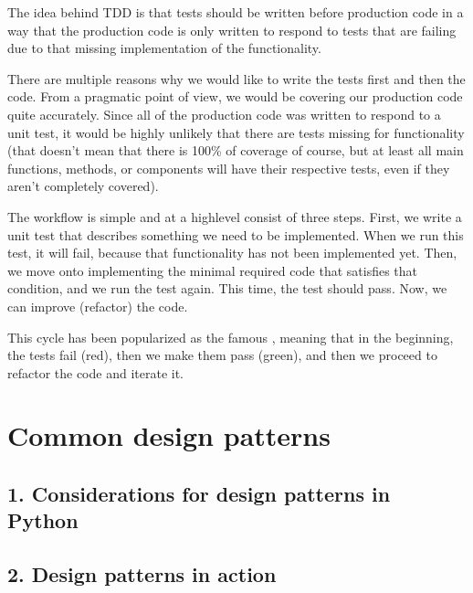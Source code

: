 \documentclass[a4paper,10pt,english]{sphinxmanual}
\begin{document}
The idea behind TDD is that tests should be written before production code in a way that
the production code is only written to respond to tests that are failing due to that missing
implementation of the functionality.

There are multiple reasons why we would like to write the tests first and then the code.
From a pragmatic point of view, we would be covering our production code quite
accurately. Since all of the production code was written to respond to a unit test, it would
be highly unlikely that there are tests missing for functionality (that doesn’t mean that there
is 100\% of coverage of course, but at least all main functions, methods, or components will
have their respective tests, even if they aren’t completely covered).

The workflow is simple and at a high\sphinxhyphen{}level consist of three steps. First, we write a unit test
that describes something we need to be implemented. When we run this test, it will fail,
because that functionality has not been implemented yet. Then, we move onto
implementing the minimal required code that satisfies that condition, and we run the test
again. This time, the test should pass. Now, we can improve (refactor) the code.

This cycle has been popularized as the famous , meaning that in the
beginning, the tests fail (red), then we make them pass (green), and then we proceed to
refactor the code and iterate it.


\chapter{Common design patterns}
\label{\detokenize{chapters/9_design_patterns/index:common-design-patterns}}\label{\detokenize{chapters/9_design_patterns/index::doc}}

\section{1. Considerations for design patterns in Python}
\label{\detokenize{chapters/9_design_patterns/index:considerations-for-design-patterns-in-python}}

\section{2. Design patterns in action}
\label{\detokenize{chapters/9_design_patterns/index:design-patterns-in-action}}
\end{document}

